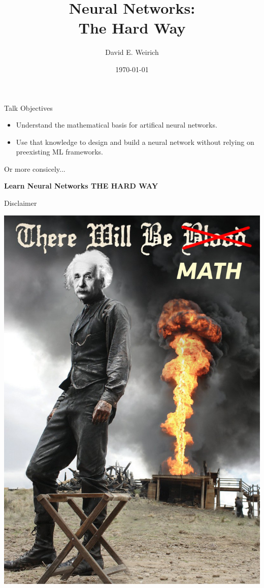 \documentclass[11pt]{beamer}
\author{David E. Weirich}
\title{Neural Networks: \\ The Hard Way}
\date{\today}
\begin{document}
\begin{frame}
\titlepage
\end{frame}

\begin{frame}{Talk Objectives}

\begin{itemize}
\item Understand the mathematical basis for artifical neural networks.

\item Use that knowledge to design and build a neural network without relying on preexisting ML frameworks.
\end{itemize}

Or more consicely...

\textbf{Learn Neural Networks THE HARD WAY}

\end{frame}

\begin{frame}{Disclaimer}
\begin{center}
\includegraphics[scale=0.18]{ThereWillBeMath}
\end{center}
\end{frame}
\end{document}
